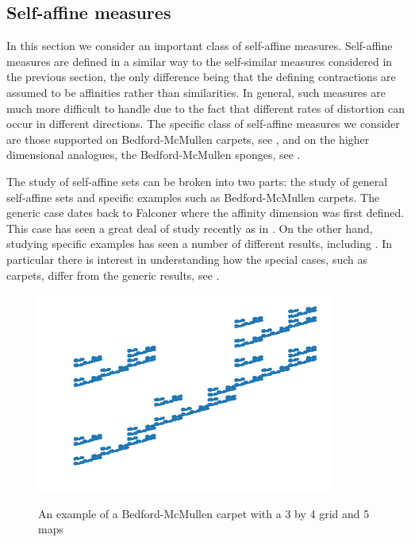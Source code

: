 \subsection{Self-affine measures}\label{ch-upper-reg:sec:self-affineresults}


In this section we consider an important class of self-affine measures.  Self-affine measures are defined in a similar way to the self-similar measures considered in the previous section, the only difference being that the defining contractions are assumed to be affinities rather than similarities.  In general, such measures are much more difficult to handle due to the fact that different rates of distortion can occur in different directions.  The specific class of self-affine measures we consider are those supported on Bedford-McMullen carpets, see \cite{bedford, mcmullen}, and on the higher dimensional analogues, the Bedford-McMullen sponges, see \cite{kenyonperes, sponges}. 

The study of self-affine sets can be broken into two parts: the study of general self-affine sets and specific examples such as Bedford-McMullen carpets. The generic case dates back to Falconer \cite{falconer-affine} where the affinity dimension was first defined. This case has seen a great deal of study recently as in \cite{barany-hochman-rapaport,hochman-rapaport}. On the other hand, studying specific examples has seen a number of different results, including \cite{bedford,mcmullen, lalley-gatzouras, baranski, mackay}. In particular there is interest in understanding how the special cases, such as carpets, differ from the generic results, see \cite{jurga-morris, morris-sert}. 

\begin{figure}[h]
	\centering
	\includegraphics[width=0.8\linewidth]{pics/ch-upper-reg/self-affine-ex.png}
	\label{ch-upper-reg:fig:example-self-affine}
	\caption{An example of a Bedford-McMullen carpet with a 3 by 4 grid and 5 maps}
\end{figure}


